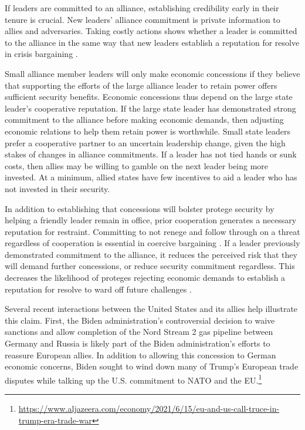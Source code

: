\documentclass[12pt]{article}
\begin{document}
If leaders are committed to an alliance, establishing credibility early in their tenure is crucial. 
New leaders' alliance commitment is private information to allies and adversaries. 
Taking costly actions shows whether a leader is committed to the alliance in the same way that new leaders establish a reputation for resolve in crisis bargaining \citep{Wolford2007}. 


Small alliance member leaders will only make economic concessions if they believe that supporting the efforts of the large alliance leader to retain power offers sufficient security benefits. 
Economic concessions thus depend on the large state leader's cooperative reputation. 
If the large state leader has demonstrated strong commitment to the alliance before making economic demands, then adjusting economic relations to help them retain power is worthwhile.
Small state leaders prefer a cooperative partner to an uncertain leadership change, given the high stakes of changes in alliance commitments.
If a leader has not tied hands or sunk costs, then allies may be willing to gamble on the next leader being more invested. 
At a minimum, allied states have few incentives to aid a leader who has not invested in their security. 


In addition to establishing that concessions will bolster protege security by helping a friendly leader remain in office, prior cooperation generates a necessary reputation for restraint. 
Committing to not renege and follow through on a threat regardless of cooperation is essential in coercive bargaining \citep{Cebuletal2021}. 
If a leader previously demonstrated commitment to the alliance, it reduces the perceived risk that they will demand further concessions, or reduce security commitment regardless.
This decreases the likelihood of proteges rejecting economic demands to establish a reputation for resolve to ward off future challenges \citep{Sechser2010, Sechser2018}. 


Several recent interactions between the United States and its allies help illustrate this claim. 
First, the Biden administration's controversial decision to waive sanctions and allow completion of the Nord Stream 2 gas pipeline between Germany and Russia is likely part of the Biden administration's efforts to reassure European allies. 
In addition to allowing this concession to German economic concerns, Biden sought to wind down many of Trump's European trade disputes while talking up the U.S. commitment to NATO and the EU.\footnote{\url{https://www.aljazeera.com/economy/2021/6/15/eu-and-us-call-truce-in-trump-era-trade-war}}
\end{document}
